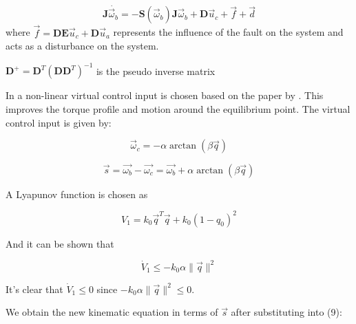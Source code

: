 \begin{equation}
    \mathbf{J}\dot{\vec{\omega}_{b}}=-\mathbf{S}(\vec{\omega}_{b})\mathbf{J}\vec{\omega}_{b}+\mathbf{D}\vec{u}_{c}+\vec{f}+\vec{d}
\end{equation} 
where $\vec{f}=\mathbf{D}\mathbf{E}\vec{u}_{c}+\mathbf{D}\vec{u}_{a}$ represents the influence of the fault on the system and acts as a disturbance on the system.



$\mathbf{D}^+=\mathbf{D}^T(\mathbf{D}\mathbf{D}^T)^{-1}$ is the pseudo inverse matrix

In \cite{shenActiveFaulttolerantControl2019} a non-linear virtual control input is chosen based on the paper by \cite{kimRobustBacksteppingControl2003}. This improves the torque profile and motion around the equilibrium point. The virtual control input is given by:

\begin{equation}\vec{\omega}_{c}=-\alpha\arctan(\beta\vec{q})\end{equation}

\begin{equation}\vec{s}=\vec{\omega_{b}}-\vec{\omega_{c}}=\vec{\omega_{b}}+\alpha\arctan(\beta\vec{q})\end{equation}

A Lyapunov function is chosen as 

\begin{equation}V_{1}=k_{0}\vec{q}^T\vec{q}+k_{0}(1-q_{0})^2\end{equation}

And it can be shown that 



\begin{equation}\dot{V}_{1}\leq-k_{0}\alpha \lVert \vec{q} \rVert^{2}\end{equation}

It's clear that $\dot{V}_{1}\leq0$ since $-k_{0}\alpha \lVert \vec{q} \rVert^{2}\leq0$.


We obtain the new kinematic equation in terms of $\vec{s}$ after substituting into (9):

